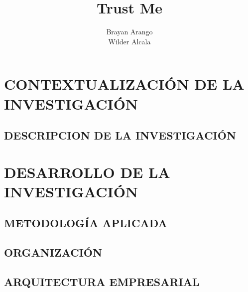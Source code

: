 \documentclass[12pt,letterpaper,oneside]{report}
\title{Trust Me}
\author{{Brayan Arango} \\ {Wilder Alcala}}
\begin{document}
	
	
	

	
	
	
	\tableofcontents
	\listoffigures
	
	
	
	\part{CONTEXTUALIZACIÓN DE LA INVESTIGACIÓN}
	
		\chapter{DESCRIPCION DE LA INVESTIGACIÓN}
			
			
			
			
			
			
			
			
	\part{DESARROLLO DE LA INVESTIGACIÓN}
		
		\chapter{METODOLOGÍA APLICADA}
			
			
			
			
		
		\chapter{ORGANIZACIÓN}
			
			
			
			
			
			
			
			
			
		\chapter{ARQUITECTURA EMPRESARIAL}
			
\end{document}
